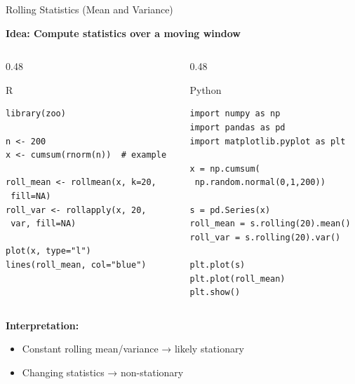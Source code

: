 \documentclass[aspectratio=169]{beamer}
\begin{document}
\begin{frame}[fragile]{Rolling Statistics (Mean and Variance)}

\small
\textbf{Idea: Compute statistics over a moving window}

\begin{columns}[T]
\begin{column}{0.48\textwidth}
\begin{block}{R}
\begin{verbatim}
library(zoo)

n <- 200
x <- cumsum(rnorm(n))  # example

roll_mean <- rollmean(x, k=20,
 fill=NA)
roll_var <- rollapply(x, 20,
 var, fill=NA)

plot(x, type="l")
lines(roll_mean, col="blue")
\end{verbatim}
\end{block}
\end{column}

\begin{column}{0.48\textwidth}
\begin{block}{Python}
\begin{verbatim}
import numpy as np
import pandas as pd
import matplotlib.pyplot as plt

x = np.cumsum(
 np.random.normal(0,1,200))

s = pd.Series(x)
roll_mean = s.rolling(20).mean()
roll_var = s.rolling(20).var()

plt.plot(s)
plt.plot(roll_mean)
plt.show()
\end{verbatim}
\end{block}
\end{column}
\end{columns}

\vspace{0.2cm}
\textbf{Interpretation:}
\begin{itemize}
    \item Constant rolling mean/variance → likely stationary
    \item Changing statistics → non-stationary
\end{itemize}

\end{frame}
\end{document}

